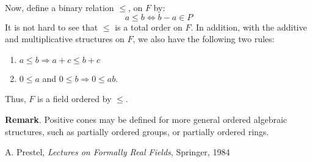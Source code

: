\documentclass[12pt]{article}
\begin{document}
Now, define a binary relation $\leq$, on $F$ by: $$a\leq b\Longleftrightarrow b-a\in P$$
It is not hard to see that $\leq$ is a total order on $F$.  In addition, with the additive and multiplicative structures on $F$, we also have the 
following two rules:
\begin{enumerate}
\item
$a\leq b \Rightarrow a+c\leq b+c$
\item
$0\leq a$ and $0\leq b\Rightarrow 0\leq ab$.
\end{enumerate}
Thus, $F$ is a field ordered by $\leq$.

\textbf{Remark}.  Positive cones may be defined for more general ordered algebraic structures, such as partially ordered groups, or partially ordered rings.


\begin{thebibliography}{99}
 A. Prestel, \emph{Lectures on Formally Real Fields}, Springer, 1984
\end{thebibliography}
\end{document}
